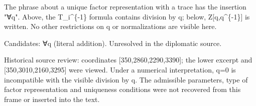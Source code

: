 \documentclass[11pt]{article}
\theoremstyle{definition}
\theoremstyle{remark}
\begin{document}
The phrase about a unique factor representation with a trace has the insertion "∀q". Above, the T\_i\textasciicircum{}\{-1\} formula contains division by q; below, Z[q,q\textasciicircum{}\{-1\}] is written. No other restrictions on q or normalizations are visible here.\par
Candidates: ∀q (literal addition). Unresolved in the diplomatic source.\par
Historical source review: coordinates [350,2860,2290,3390]; the lower excerpt and [350,3010,2160,3295] were viewed. Under a numerical interpretation, q=0 is incompatible with the visible division by q. The admissible parameters, type of factor representation and uniqueness conditions were not recovered from this frame or inserted into the text.\par\medskip
\end{document}
